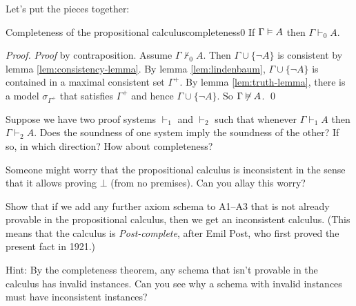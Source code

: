 Let's put the pieces together:

\begin{theorem}{Completeness of the propositional calculus}{completeness0}
  If $\Gamma \vDash A$ then $\Gamma \vdash_{0} A$.
\end{theorem}
\begin{proof}
  \emph{Proof} by contraposition.
  Assume $\Gamma \not\vdash_{0} A$.
  Then $\Gamma \cup \{\neg A\}$ is consistent by lemma \ref{lem:consistency-lemma}.
  By lemma \ref{lem:lindenbaum},
  $\Gamma \cup \{\neg A\}$ is contained in a maximal consistent set $\Gamma^{+}$.
  By lemma \ref{lem:truth-lemma},
  there is a model $\sigma_{\Gamma^{+}}$ that satisfies $\Gamma^{+}$
  and hence $\Gamma \cup \{\neg A\}$.
  So $\Gamma \not\vDash A$.
  \qed
\end{proof}

\begin{exercise}
  Suppose we have two proof systems $\vdash_{1}$ and $\vdash_{2}$ such that
  whenever $\Gamma \vdash_{1} A$ then $\Gamma \vdash_{2} A$.
  Does the soundness of one system imply the soundness of the other?
  If so, in which direction?
  How about completeness?
\end{exercise}

\begin{exercise}
  Someone might worry that the propositional calculus is inconsistent
  in the sense that it allows proving $\bot$ (from no premises).
  Can you allay this worry?
\end{exercise}


\begin{exercise}
  Show that
  if we add any further axiom schema to A1--A3
  that is not already provable in the propositional calculus,
  then we get an inconsistent calculus.
  (This means that the calculus is \textit{Post-complete},
  after Emil Post, who first proved the present fact in 1921.)

  Hint:
  By the completeness theorem,
  any schema that isn't provable in the calculus has invalid instances.
  Can you see why a schema with invalid instances
  must have inconsistent instances?
\end{exercise}




